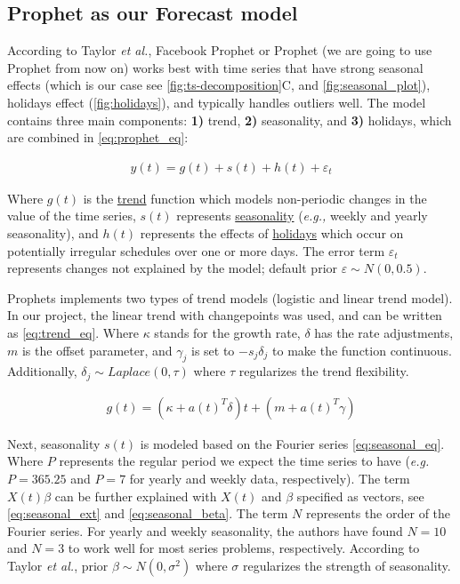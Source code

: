 \subsection[Prophet as our Forecast model]{Prophet as our Forecast model}
\label{sec:forecast_model}

According to Taylor \textit{et al.}\autocite{taylor2018forecasting}, Facebook Prophet or Prophet (we are going to use Prophet from now on)  works best with time series that have strong seasonal effects (which is our case see \autoref{fig:ts-decomposition}C, and \autoref{fig:seasonal_plot}), holidays effect (\autoref{fig:holidays}), and typically handles outliers well. The model contains three main components: \textbf{1)} trend, \textbf{2)} seasonality, and \textbf{3)} holidays, which are combined in \autoref{eq:prophet_eq}:

\begin{align}\label{eq:prophet_eq}
y(t)= g(t) + s(t) + h(t) + \varepsilon_t  
\end{align}

Where $g(t)$ is the \underline{trend} function which models non-periodic changes in the value of the time series, $s(t)$ represents \underline{seasonality} (\textit{e.g.,} weekly and yearly seasonality), and $h(t)$ represents the effects of \underline{holidays} which occur on potentially irregular schedules over one or more days. The error term $\varepsilon_t$ represents changes not explained by the model; default prior $\varepsilon \sim N(0,0.5)$.

Prophets implements two types of trend models (logistic and linear trend model). In our project, the linear trend with changepoints was used, and can be written as \autoref{eq:trend_eq}. Where $\kappa$ stands for the growth rate, $\delta$ has the rate adjustments, $m$ is the offset parameter, and $\gamma_j$ is set to $-s_j\delta_j$ to make the function continuous. Additionally, $\delta_j \sim Laplace(0,\tau)$  where $\tau$ regularizes the trend flexibility.  

\begin{align}\label{eq:trend_eq}
g(t)= (\kappa + a(t)^T\delta)t + (m + a(t)^T\gamma)
\end{align}  

Next, seasonality $s(t)$ is modeled based on the Fourier series \autoref{eq:seasonal_eq}. Where $P$ represents the regular period we expect the time series to have (\textit{e.g.} $P=365.25$ and $P=7$ for yearly and weekly data, respectively). The term $X(t)\beta$ can be further explained with $X(t)$ and $\beta$ specified as vectors, see \autoref{eq:seasonal_ext} and \autoref{eq:seasonal_beta}. The term $N$ represents the order of the Fourier series. For yearly and weekly seasonality, the authors have found $N = 10$ and $N = 3$ to work well for most series problems, respectively. According to Taylor \textit{et al.}, prior $\beta \sim N(0,\sigma^2)$ where $\sigma$ regularizes the strength of seasonality.

